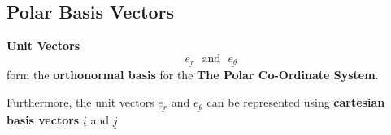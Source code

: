 \subsection{Polar Basis Vectors}
\begin{definition}
	{\bf Unit Vectors} $$\underline{e_r} \ \ \  \text{and} \ \ \ \underline{e_{\theta}}$$
	form the {\bf orthonormal basis} for  the {\bf The Polar Co-Ordinate System}.
\end{definition}

Furthermore, the unit vectors $\underline{e_r}$ and $\underline{e_{\theta}}$ can be represented using {\bf cartesian basis vectors} $\underline{i}$ and $\underline{j}$

\begin{mycenter}

	\begin{tikzpicture}[x=0.75pt,y=0.75pt,yscale=-1,xscale=1]


\end{tikzpicture}
\end{mycenter}
